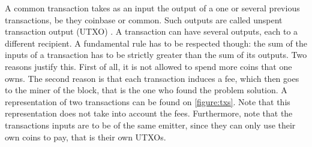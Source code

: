 \documentclass[11pt]{report}
\begin{document}
                A common transaction takes as an input the output of a one or several previous transactions, be they coinbase or common. Such outputs are called unspent transaction output (UTXO) \cite{Survey}. A transaction can have several outputs, each to a different recipient. A fundamental rule has to be respected though: the sum of the inputs of a transaction has to be strictly greater than the sum of its outputs. Two reasons justify this. First of all, it is not allowed to spend more coins that one owns. The second reason is that each transaction induces a fee, which then goes to the miner of the block, that is the one who found the problem solution. A representation of two transactions can be found on \autoref{figure:txs}. Note that this representation does not take into account the fees. Furthermore, note that the transactions inputs are to be of the same emitter, since they can only use their own coins to pay, that is their own UTXOs.
                
\end{document}
